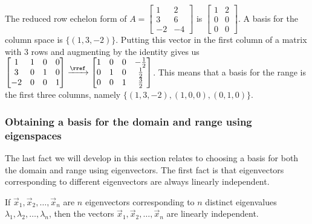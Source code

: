 \begin{example}
The reduced row echelon form of 
$A=
\begin{bmatrix}
 1 & 2 \\
 3 & 6 \\
 -2 & -4
\end{bmatrix}
$
is
$
\begin{bmatrix}
 1 & 2 \\
 0 & 0 \\
 0 & 0
\end{bmatrix}
$.  
A basis for the column space is $\{(1,3,-2)\}$. Putting this vector in the first column of a matrix with 3 rows and augmenting by the identity gives us 
$
\begin{bmatrix}
 1 & 1 & 0 & 0 \\
 3 & 0 & 1 & 0 \\
 -2 & 0 & 0 & 1
\end{bmatrix}
\xrightarrow{\rref}
\begin{bmatrix}
 1 & 0 & 0 & -\frac{1}{2} \\
 0 & 1 & 0 & \frac{1}{2} \\
 0 & 0 & 1 & \frac{3}{2}
\end{bmatrix}
$.
This means that a basis for the range is the first three columns, namely $\{(1,3,-2),(1,0,0),(0,1,0)\}$.

\end{example}

\subsubsection{Obtaining a basis for the domain and range using eigenspaces}
The last fact we will develop in this section relates to choosing a basis for both the domain and range using eigenvectors.  The first fact is that eigenvectors corresponding to different eigenvectors are always linearly independent.
\begin{theorem}
If $\vec x_1,\vec x_2,\ldots,\vec x_n$ are $n$ eigenvectors corresponding to $n$ distinct eigenvalues $\lambda_1, \lambda_2,\ldots, \lambda_n$, then the vectors $\vec x_1,\vec x_2,\ldots,\vec x_n$ are linearly independent.
\end{theorem}

